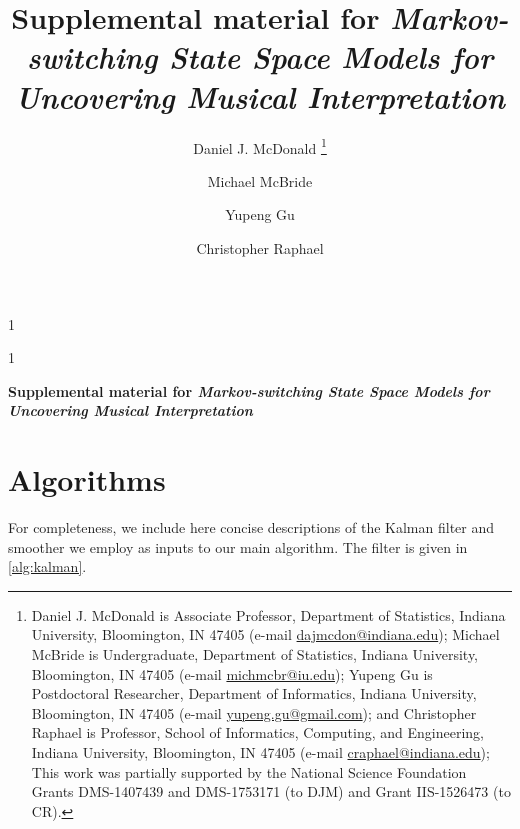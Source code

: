 \documentclass[12pt]{article}
\newcommand{\blind}{1}
\newcommand{\email}[1]{\href{mailto:#1}{#1}}
\begin{document}
\def\spacingset#1{\renewcommand{\baselinestretch}%
{#1}\small\normalsize} \spacingset{1}


\blind
{
  \title{\bf Supplemental material for \emph{Markov-switching State Space Models for
Uncovering Musical Interpretation}}

  \author{
        Daniel J. McDonald \thanks{Daniel J. McDonald is Associate Professor, Department of Statistics,
Indiana University, Bloomington, IN 47405 (e-mail
\email{dajmcdon@indiana.edu}); Michael McBride is Undergraduate,
Department of Statistics, Indiana University, Bloomington, IN 47405
(e-mail \email{michmcbr@iu.edu}); Yupeng Gu is Postdoctoral Researcher,
Department of Informatics, Indiana University, Bloomington, IN 47405
(e-mail \email{yupeng.gu@gmail.com}); and Christopher Raphael is
Professor, School of Informatics, Computing, and Engineering, Indiana
University, Bloomington, IN 47405 (e-mail \email{craphael@indiana.edu});
This work was partially supported by the National Science Foundation
Grants DMS-1407439 and DMS-1753171 (to DJM) and Grant IIS-1526473 (to
CR).} 
     \and     Michael McBride 
     \and     Yupeng Gu 
     \and     Christopher Raphael 
      }
  \maketitle
} \fi

\blind
{
  \bigskip
  \bigskip
  \bigskip
  \begin{center}
    {\LARGE\bf Supplemental material for \emph{Markov-switching State Space Models for
Uncovering Musical Interpretation}}
  \end{center}
  \medskip
} \fi


\spacingset{1.45} %

\hypertarget{algorithms}{%
\section{Algorithms}\label{algorithms}}

For completeness, we include here concise descriptions of the Kalman
filter and smoother we employ as inputs to our main algorithm. The
filter is given in \autoref{alg:kalman}.
\end{document}

